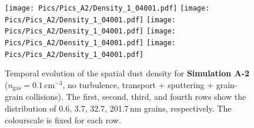 \documentclass[fleqn,usenatbib]{mnras}
\begin{document}
\begin{figure}
   \texttt{[image: Pics/Pics\_A2/Density\_1\_04001.pdf]}\hspace*{-0.05cm}
   \texttt{[image: Pics/Pics\_A2/Density\_1\_04001.pdf]}\hspace*{-0.05cm}
   \texttt{[image: Pics/Pics\_A2/Density\_1\_04001.pdf]}\hspace*{-0.05cm}
   \texttt{[image: Pics/Pics\_A2/Density\_1\_04001.pdf]}\hspace*{-0.05cm}
   \texttt{[image: Pics/Pics\_A2/Density\_1\_04001.pdf]}\\    

  \caption{Temporal evolution of the spatial dust density for \textbf{Simulation A-2} ($n_\text{gas}=0.1\,\text{cm}^{-3}$, no turbulence, transport + sputtering + grain-grain collisions). The first, second, third, and fourth rows show the distribution of 0.6, 3.7, 32.7, 201.7$\,$nm grains, respectively. The colourscale is fixed for each row.}
   \label{fig_A2} 
  \end{figure}  
  
\end{document}
